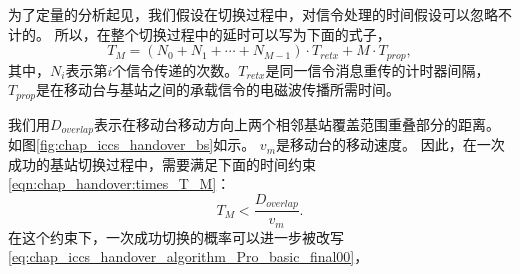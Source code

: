为了定量的分析起见，我们假设在切换过程中，对信令处理的时间假设可以忽略不计的。
所以，在整个切换过程中的延时可以写为下面的式子，
$$
T_{M}=(N_{0}+N_{1}+\cdots+N_{M-1})\cdot T_{retx}+M\cdot T_{prop},
$$
其中，$N_i$表示第$i$个信令传递的次数。$T_{retx}$是同一信令消息重传的计时器间隔，$T_{prop}$是在移动台与基站之间的承载信令的电磁波传播所需时间。

我们用$D_{overlap}$表示在移动台移动方向上两个相邻基站覆盖范围重叠部分的距离。
如图\ref{fig:chap_iccs_handover_bs}如示。
$v_m$是移动台的移动速度。
因此，在一次成功的基站切换过程中，需要满足下面的时间约束\eqref{eqn:chap_handover:times_T_M}：
\begin{equation}
T_{M}<\frac{D_{overlap}}{v_{m}}.
\label{eqn:chap_handover:times_T_M}
\end{equation}
在这个约束下，一次成功切换的概率可以进一步被改写\eqref{eq:chap_iccs_handover_algorithm_Pro_basic_final00}，

